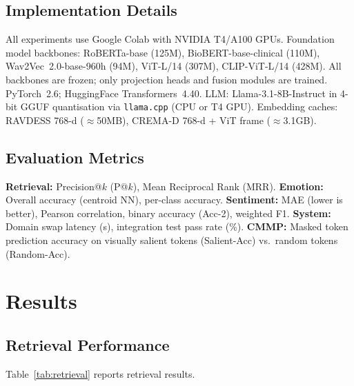 \documentclass[10pt,conference]{IEEEtran}
\theoremstyle{ieeethm}
\theoremstyle{ieeedef}
\theoremstyle{ieeeremark}
\begin{document}
\subsection{Implementation Details}

All experiments use Google Colab with NVIDIA T4/A100 GPUs. Foundation model backbones: RoBERTa-base (125M), BioBERT-base-clinical (110M), Wav2Vec~2.0-base-960h (94M), ViT-L/14 (307M), CLIP-ViT-L/14 (428M). All backbones are frozen; only projection heads and fusion modules are trained. PyTorch~2.6; HuggingFace Transformers~4.40. LLM: Llama-3.1-8B-Instruct in 4-bit GGUF quantisation via \texttt{llama.cpp} (CPU or T4 GPU). Embedding caches: RAVDESS 768-d ($\approx$50MB), CREMA-D 768-d + ViT frame ($\approx$3.1GB).

\subsection{Evaluation Metrics}

\textbf{Retrieval:} Precision@$k$ (P@$k$), Mean Reciprocal Rank (MRR). \textbf{Emotion:} Overall accuracy (centroid NN), per-class accuracy. \textbf{Sentiment:} MAE (lower is better), Pearson correlation, binary accuracy (Acc-2), weighted F1. \textbf{System:} Domain swap latency (s), integration test pass rate (\%). \textbf{CMMP:} Masked token prediction accuracy on visually salient tokens (Salient-Acc) vs.\ random tokens (Random-Acc).

\section{Results}
\label{sec:results}

\subsection{Retrieval Performance}

Table~\ref{tab:retrieval} reports retrieval results.
\end{document}
